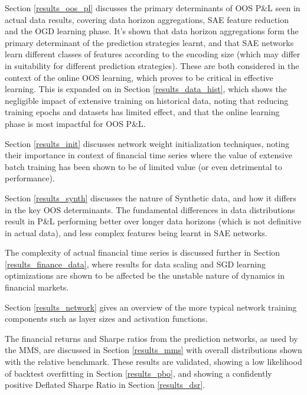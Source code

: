 \documentclass[a4paper,11pt,oneside]{article}
\theoremstyle{plain}
\theoremstyle{definition}
\begin{document}
	Section \ref{results_oos_pl} discusses the primary determinants of OOS P\&L seen in actual data results, covering data horizon aggregations, SAE feature reduction and the OGD learning phase. It's shown that data horizon aggregations form the primary determinant of the prediction strategies learnt, and that SAE networks learn different classes of features according to the encoding size (which may differ in suitability for different prediction strategies). These are both considered in the context of the online OOS learning, which proves to be critical in effective learning. This is expanded on in Section \ref{results_data_hist}, which shows the negligible impact of extensive training on historical data, noting that reducing training epochs and datasets has limited effect, and that the online learning phase is most impactful for OOS P\&L. \newline
	
	Section \ref{results_init} discusses network weight initialization techniques, noting their importance in context of financial time series where the value of extensive batch training has been shown to be of limited value (or even detrimental to performance).\newline
	
	Section \ref{results_synth} discusses the nature of Synthetic data, and how it differs in the key OOS determinants. The fundamental differences in data distributions result in P\&L performing better over longer data horizons (which is not definitive in actual data), and less complex features being learnt in SAE networks.\newline
	
	The complexity of actual financial time series is discussed further in Section \ref{results_finance_data}, where results for data scaling and SGD learning optimizations are shown to be affected be the unstable nature of dynamics in financial markets.\newline
	
	Section \ref{results_network} gives an overview of the more typical network training components such as layer sizes and activation functions.\newline
	
	The financial returns and Sharpe ratios from the prediction networks, as used by the MMS, are discussed in Section \ref{results_mms} with overall distributions shown with the relative benchmark. These results are validated, showing a low likelihood of backtest overfitting in Section \ref{results_pbo}, and showing a confidently positive Deflated Sharpe Ratio in Section \ref{results_dsr}.  \newline
	
\end{document}
